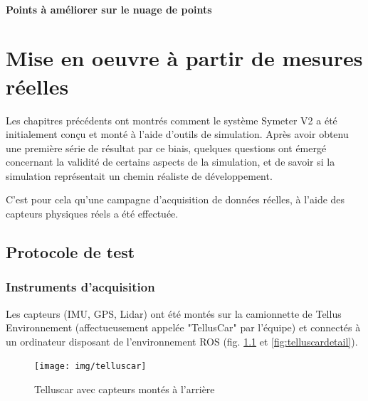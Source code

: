 \documentclass[12pt,a4paper]{report}
\begin{document}
		\subsubsection{Points à améliorer sur le nuage de points}
		
		
		
		
\chapter{Mise en oeuvre à partir de mesures réelles}

Les chapitres précédents ont montrés comment le système Symeter V2 a été initialement conçu et monté à l'aide d'outils de simulation. Après avoir obtenu une première série de résultat par ce biais, quelques questions ont émergé concernant la validité de certains aspects de la simulation, et de savoir si la simulation représentait un chemin réaliste de développement.

\para C'est pour cela qu'une campagne d'acquisition de données réelles, à l'aide des capteurs physiques réels a été effectuée.

	\section{Protocole de test}
	\subsection{Instruments d'acquisition}
	Les capteurs (IMU, GPS, Lidar) ont été montés sur la camionnette de Tellus Environnement (affectueusement appelée "TellusCar" par l'équipe) et connectés à un ordinateur disposant de l'environnement ROS (fig. \ref{fig:telluscar} et \ref{fig:telluscardetail}).
	
	\begin{figure}[h!]
		\centering
		\texttt{[image: img/telluscar]}
		\caption[telluscar]{Telluscar avec capteurs montés à l'arrière}
		\label{fig:telluscar}
	\end{figure}
\end{document}
